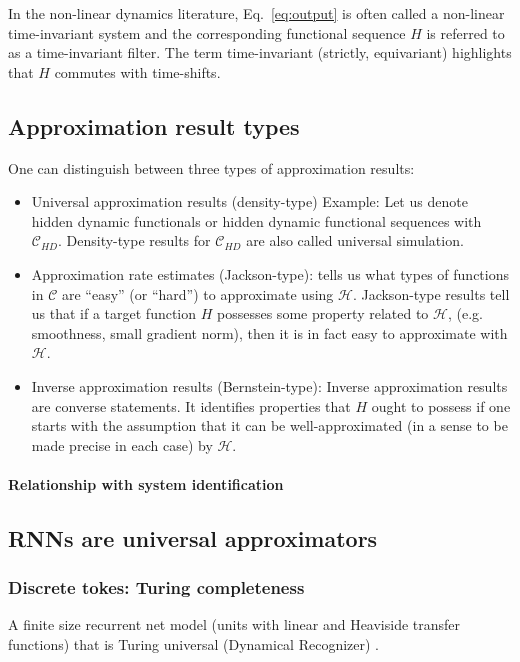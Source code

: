 \documentclass{article}
\theoremstyle{definition}
\theoremstyle{remark}
\begin{document}
In the non-linear dynamics literature, Eq.~\ref{eq:output} is often called a non-linear time-invariant system and the corresponding functional sequence $H$ is referred to as a time-invariant filter.
The term time-invariant (strictly, equivariant) highlights that $H$ commutes with time-shifts.



\subsection{Approximation result types}
One can distinguish between three types of approximation results\citep{jiang2023brief}:
\begin{itemize}
    \item Universal approximation results (density-type)
    \citep{li2021approximation}
    Example: Let us denote hidden dynamic functionals or hidden dynamic functional sequences with $\mathcal{C}_{HD}$. Density-type results for $\mathcal{C}_{HD}$ are also called universal simulation.
    \item Approximation rate estimates (Jackson-type): tells us  what types of functions in $\mathcal{C}$ are “easy” (or “hard”) to approximate using $\mathcal{H}$.
    Jackson-type results tell us that if a target function $H$ possesses some property related to $\mathcal{H}$, (e.g. smoothness, small gradient norm), then it is in fact easy to approximate with $\mathcal{H}$. 
    \citep{allen2019convergence}
    \item Inverse approximation results (Bernstein-type): Inverse approximation results are converse statements. It identifies properties that $H$ ought to possess if one starts with the assumption that it can be well-approximated (in a sense to be made precise in each case) by $\mathcal{H}$.
\end{itemize}

\paragraph{Relationship with system identification}
\citep{ljung2010perspectives, nelles2020nonlinear}


\subsection{RNNs are universal approximators}
\subsubsection{Discrete tokes: Turing completeness}
A finite size recurrent net model (units with linear and Heaviside transfer functions) that is Turing universal (Dynamical Recognizer) \citep{pollack1991induction}.
\end{document}
